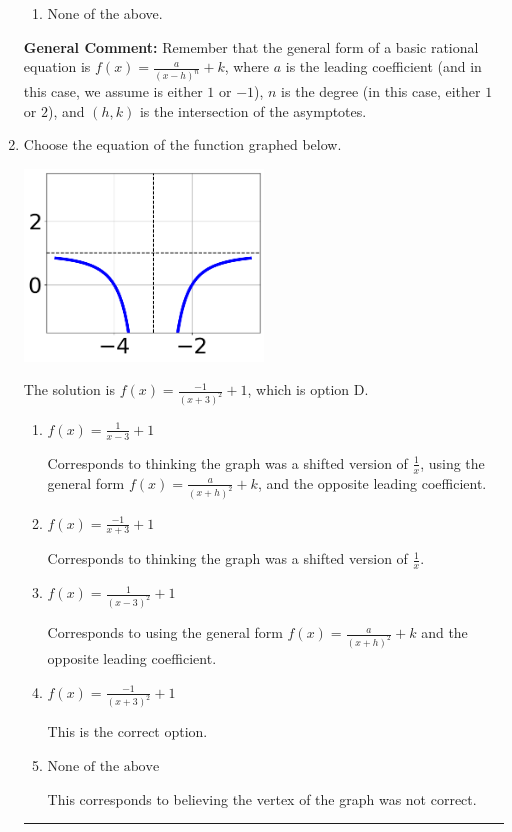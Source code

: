 \documentclass{extbook}[14pt]
\newcommand{\litem}[1]{\item #1

\rule{\textwidth}{0.4pt}}
\begin{document}
\begin{enumerate}
{\begin{enumerate}[label=\Alph*.]
\begin{multicols}{2}
\end{multicols}\item None of the above.\end{enumerate}
\textbf{General Comment:} Remember that the general form of a basic rational equation is $ f(x) = \frac{a}{(x-h)^n} + k$, where $a$ is the leading coefficient (and in this case, we assume is either $1$ or $-1$), $n$ is the degree (in this case, either $1$ or $2$), and $(h, k)$ is the intersection of the asymptotes.
}
\litem{
Choose the equation of the function graphed below.

\begin{center}
    \includegraphics[width=0.5\textwidth]{../Figures/rationalGraphToEquationCopyC.png}
\end{center}


The solution is \( f(x) = \frac{-1}{(x + 3)^2} + 1 \), which is option D.\begin{enumerate}[label=\Alph*.]
\item \( f(x) = \frac{1}{x - 3} + 1 \)

Corresponds to thinking the graph was a shifted version of $\frac{1}{x}$, using the general form $f(x) = \frac{a}{(x+h)^2}+k$, and the opposite leading coefficient.
\item \( f(x) = \frac{-1}{x + 3} + 1 \)

Corresponds to thinking the graph was a shifted version of $\frac{1}{x}$.
\item \( f(x) = \frac{1}{(x - 3)^2} + 1 \)

Corresponds to using the general form $f(x) = \frac{a}{(x+h)^2}+k$ and the opposite leading coefficient.
\item \( f(x) = \frac{-1}{(x + 3)^2} + 1 \)

This is the correct option.
\item \( \text{None of the above} \)

This corresponds to believing the vertex of the graph was not correct.
\end{enumerate}

}
\end{enumerate}
\end{document}
